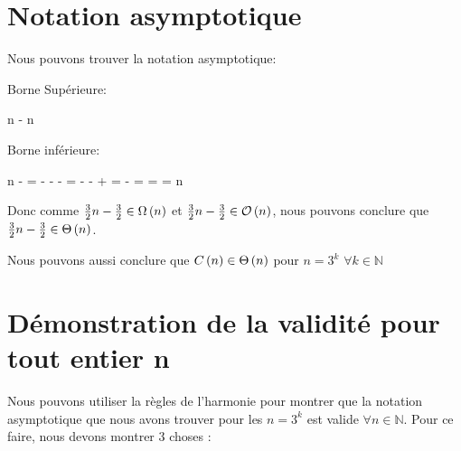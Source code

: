 \documentclass[class=article]{standalone}
\begin{document}
\section*{Notation asymptotique}
Nous pouvons trouver la notation asymptotique:

Borne Supérieure:
\begin{deriv}
  n - 
  \<\leq
  n
  \<\in 
  \BigO{}
\end{deriv}

Borne inférieure:
\begin{deriv}
  n - 
  \<=
   - 
  \<\geq
   -  - 
  \<=
   -  -  + 
  \<=
   - 
  \<=
  \<=
  \<=
  n
  \<\in
  \Omega{}
\end{deriv}

Donc comme $\frac{3}{2}n - \frac{3}{2} \in \Omega \left ( n \right )$ et $\frac{3}{2}n - \frac{3}{2} \in \mathcal{O} \left ( n \right )$,
nous pouvons conclure que $\frac{3}{2}n - \frac{3}{2} \in \Theta\left ( n \right )$.

Nous pouvons aussi conclure que $C\left ( n \right ) \in \Theta\left ( n \right )$ pour $n = 3^k$ $\forall k \in \mathbb{N}$

\section*{Démonstration de la validité pour tout entier n}
Nous pouvons utiliser la règles de l'harmonie pour montrer que la notation asymptotique que
nous avons trouver pour les $n = 3^k$ est valide $\forall n \in \mathbb{N}$. Pour ce faire, nous devons montrer 3 choses :
\end{document}
